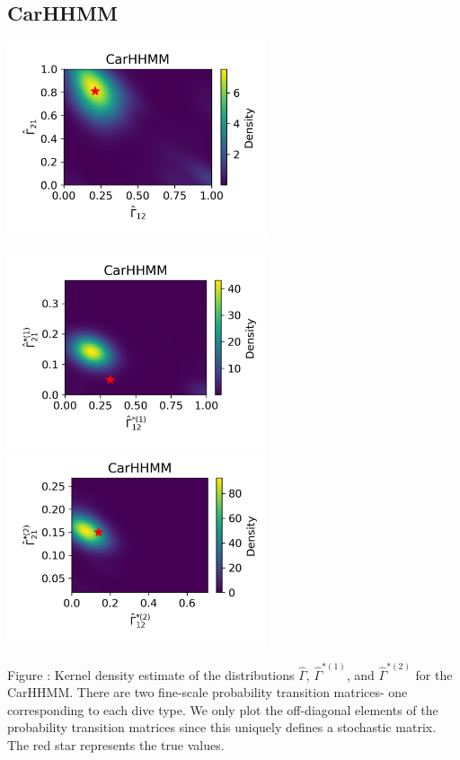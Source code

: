 \documentclass{article}
\begin{document}
        \newpage
        \subsection{CarHHMM}
        \begin{center}
        \includegraphics[width=3in]{../Plots/hhmm_V_Gamma_density_-1.png}
        
        \includegraphics[width=3in]{../Plots/hhmm_V_Gamma_density_0.png}
        \includegraphics[width=3in]{../Plots/hhmm_V_Gamma_density_1.png}
        \end{center}
        
        \noindent Figure : Kernel density estimate of the distributions $\hat \Gamma$, $\hat \Gamma^{*(1)}$, and $\hat \Gamma^{*(2)}$ for the CarHHMM. There are two fine-scale probability transition matrices- one corresponding to each dive type. We only plot the off-diagonal elements of the probability transition matrices since this uniquely defines a stochastic matrix. The red star represents the true values.
        \addtocounter{fignum}{1}
        
\end{document}
